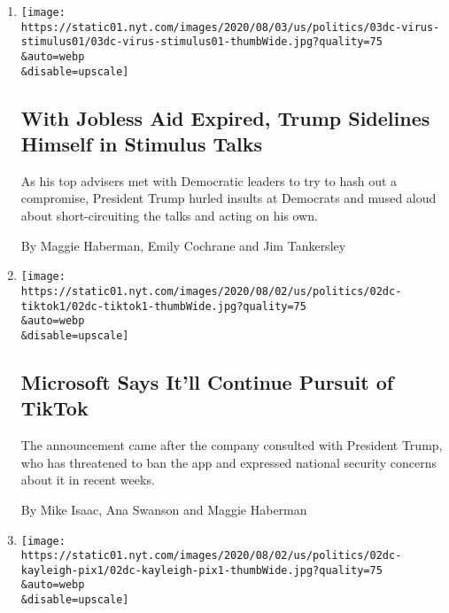 \begin{enumerate}
\def\labelenumi{\arabic{enumi}.}
\item
  \href{/2020/08/03/us/politics/congress-jobless-aid-talks-trump.html}{}

  \texttt{[image: https://static01.nyt.com/images/2020/08/03/us/politics/03dc-virus-stimulus01/03dc-virus-stimulus01-thumbWide.jpg?quality=75\\\&auto=webp\\\&disable=upscale]}

  \hypertarget{with-jobless-aid-expired-trump-sidelines-himself-in-stimulus-talks}{%
  \subsection{With Jobless Aid Expired, Trump Sidelines Himself in
  Stimulus
  Talks}\label{with-jobless-aid-expired-trump-sidelines-himself-in-stimulus-talks}}

  As his top advisers met with Democratic leaders to try to hash out a
  compromise, President Trump hurled insults at Democrats and mused
  aloud about short-circuiting the talks and acting on his own.

  By Maggie Haberman, Emily Cochrane and Jim Tankersley
\item
  \href{/2020/08/02/business/economy/trump-tiktok-china-national-security.html}{}

  \texttt{[image: https://static01.nyt.com/images/2020/08/02/us/politics/02dc-tiktok1/02dc-tiktok1-thumbWide.jpg?quality=75\\\&auto=webp\\\&disable=upscale]}

  \hypertarget{microsoft-says-itll-continue-pursuit-of-tiktok}{%
  \subsection{Microsoft Says It'll Continue Pursuit of
  TikTok}\label{microsoft-says-itll-continue-pursuit-of-tiktok}}

  The announcement came after the company consulted with President
  Trump, who has threatened to ban the app and expressed national
  security concerns about it in recent weeks.

  By Mike Isaac, Ana Swanson and Maggie Haberman
\item
  \href{/2020/08/02/us/politics/kayleigh-mcenany.html}{}

  \texttt{[image: https://static01.nyt.com/images/2020/08/02/us/politics/02dc-kayleigh-pix1/02dc-kayleigh-pix1-thumbWide.jpg?quality=75\\\&auto=webp\\\&disable=upscale]}

  \hypertarget{white-house-memo}{%
}
\end{enumerate}
